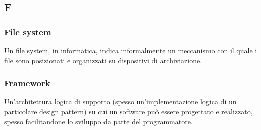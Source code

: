 \subsection*{\textbf{\hfill \Huge{F} \hfill}} 
\subsubsection*{File system}
Un file system, in informatica, indica informalmente un meccanismo con il quale i file sono posizionati e organizzati su dispositivi di archiviazione.
\subsubsection*{Framework}
Un’architettura logica di supporto (spesso un’implementazione logica di un particolare design pattern) su cui un software può essere progettato e realizzato, spesso facilitandone lo sviluppo da parte del programmatore.
